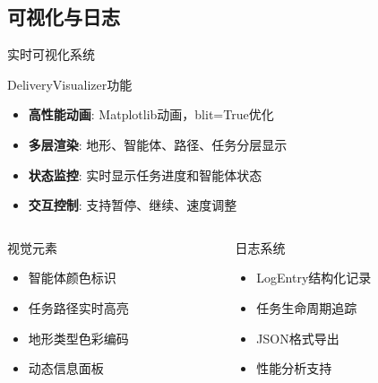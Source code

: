 \documentclass[
10pt,
aspectratio=169,
]{beamer}
\begin{document}
\subsection{可视化与日志}

\begin{frame}{实时可视化系统}
    \begin{block}{DeliveryVisualizer功能}
        \begin{itemize}
            \item \textbf{高性能动画}: Matplotlib动画，blit=True优化
            \item \textbf{多层渲染}: 地形、智能体、路径、任务分层显示
            \item \textbf{状态监控}: 实时显示任务进度和智能体状态
            \item \textbf{交互控制}: 支持暂停、继续、速度调整
        \end{itemize}
    \end{block}
    
    \begin{columns}
        \begin{column}{0.5\textwidth}
            \begin{exampleblock}{视觉元素}
                \begin{itemize}
                    \item 智能体颜色标识
                    \item 任务路径实时高亮
                    \item 地形类型色彩编码
                    \item 动态信息面板
                \end{itemize}
            \end{exampleblock}
        \end{column}
        \begin{column}{0.5\textwidth}
            \begin{alertblock}{日志系统}
                \begin{itemize}
                    \item LogEntry结构化记录
                    \item 任务生命周期追踪
                    \item JSON格式导出
                    \item 性能分析支持
                \end{itemize}
            \end{alertblock}
        \end{column}
    \end{columns}
\end{frame}
\end{document}
